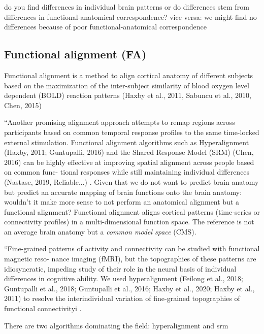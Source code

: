 %
do you find differences in individual brain patterns or do differences stem from
differences in functional-anatomical correspondence?
%
vice versa: we might find no differences because of poor functional-anatomical
correspondence


\subsection{Functional alignment (FA)}

Functional alignment is a method to align cortical anatomy of different subjects
based on the maximization of the inter-subject similarity of blood oxygen level
dependent (BOLD) reaction patterns (Haxby et al., 2011, Sabuncu et al., 2010,
Chen, 2015)

``Another promising alignment approach attempts to remap regions across
participants based on common temporal response profiles to the same
time-locked external stimulation. Functional alignment algorithms such as
Hyperalignment (Haxby, 2011; Guntupalli, 2016) and the Shared Response Model
(SRM) (Chen, 2016) can be highly effective at improving spatial alignment across
people based on common func- tional responses while still maintaining individual
differences (Nastase, 2019, Reliable...) \citep{chang2021endogenous}.
%
Given that we do not want to predict brain anatomy but predict an accurate
mapping of brain functions onto the brain anatomy:
%
wouldn't it make more sense to not perform an anatomical alignment but a
functional alignment?
%
Functional alignment aligns cortical patterns (time-series or connectivity
profiles) in a multi-dimensional function space.
The reference is not an average brain anatomy but a \textit{common model space}
(CMS).

``Fine-grained patterns of activity and connectivity can be studied with
functional magnetic reso- nance imaging (fMRI), but the topographies of these
patterns are idiosyncratic, impeding study of their role in the neural basis of
individual differences in cognitive ability. We used hyperalignment (Feilong et
al., 2018; Guntupalli et al., 2018; Guntupalli et al., 2016; Haxby et al., 2020;
Haxby et al., 2011) to resolve the interindividual variation of fine-grained
topographies of functional connectivityi \citep{feilong2021neural}.

%
There are two algorithms dominating the field: hyperalignment and \ac{srm}


